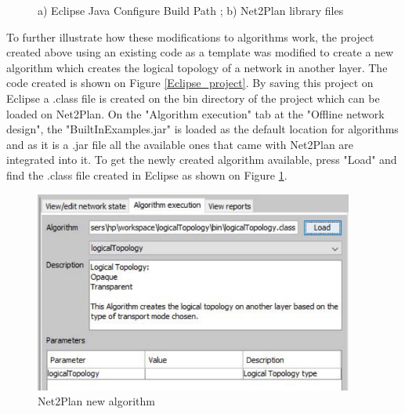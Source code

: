 	\vspace{1.5cm}
	\begin{figure}[!h]
		\centering
		\caption{a) Eclipse Java Configure Build Path ; b) Net2Plan library files}
	\end{figure}	
	

	
	To further illustrate how these modifications to algorithms work, the project created above using an existing code as a template was modified to create a new algorithm which creates the logical topology of a network in another layer.
	\newpage
	 The code created is shown on Figure \ref{Eclipse_project}.
	By saving this project on Eclipse a .class file is created on the bin directory of the project which can be loaded on Net2Plan. On the "Algorithm execution" tab at the "Offline network design", the "BuiltInExamples.jar" is loaded as the default location for algorithms and as it is a .jar file all the available ones that came with Net2Plan are integrated into it.	To get the newly created algorithm available, press "Load" and find the .class file created in Eclipse as shown on Figure \ref{Net2Plan_introduce_algorithm}.
	
	\begin{figure}[h!]
		\centering
		\includegraphics[width = 10.5cm]{Net2Plan_introduce_algorithm.pdf}
		\caption{Net2Plan new algorithm}
		\label{Net2Plan_introduce_algorithm}
	\end{figure}
			
